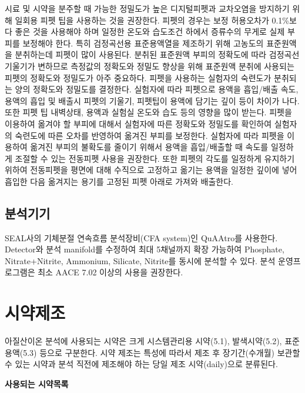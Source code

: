 \documentclass[
]{book}
\begin{document}
시료 및 시약을 분주할 때 가능한 정밀도가 높은 디지털피펫과 교차오염을 방지하기 위해 일회용 피펫 팁을 사용하는 것을 권장한다. 피펫의 경우는 보정 허용오차가 0.1\%보다 좋은 것을 사용해야 하며 일정한 온도와 습도조건 하에서 증류수의 무게로 실제 부피를 보정해야 한다. 특히 검정곡선용 표준용액열을 제조하기 위해 고농도의 표준원액을 분취하는데 피펫이 많이 사용된다. 분취된 표준원액 부피의 정확도에 따라 검정곡선 기울기가 변하므로 측정값의 정확도와 정밀도 향상을 위해 표준원액 분취에 사용되는 피펫의 정확도와 정밀도가 아주 중요하다.
피펫을 사용하는 실험자의 숙련도가 분취되는 양의 정확도와 정밀도를 결정한다. 실험자에 따라 피펫으로 용액을 흡입/배출 속도, 용액의 흡입 및 배출시 피펫의 기울기, 피펫팁이 용액에 담기는 깊이 등이 차이가 나다. 또한 피펫 팁 내벽상태, 용액과 실험실 온도와 습도 등의 영향을 많이 받는다. 피펫을 이용하여 옮겨야 할 부피에 대해서 실험자에 따른 정확도와 정밀도를 확인하여 실험자의 숙련도에 따른 오차를 반영하여 옮겨진 부피를 보정한다. 실험자에 따라 피펫을 이용하여 옮겨진 부피의 불확도를 줄이기 위해서 용액을 흡입/배출할 때 속도를 일정하게 조절할 수 있는 전동피펫 사용을 권장한다. 또한 피펫의 각도를 일정하게 유지하기 위하여 전동피펫을 평면에 대해 수직으로 고정하고 옮기는 용액을 일정한 깊이에 넣어 흡입한 다음 옮겨지는 용기를 고정된 피펫 아래로 가져와 배출한다.

\hypertarget{uxbd84uxc11duxae30uxae30}{%
\subsection{분석기기}\label{uxbd84uxc11duxae30uxae30}}

SEAL사의 기체분절 연속흐름 분석장비(CFA system)인 QuAAtro를 사용한다. Detector와 분석 manifold를 수정하여 최대 5채널까지 확장 가능하여 Phosphate, Nitrate+Nitrite, Ammonium, Silicate, Nitrite를 동시에 분석할 수 있다. 분석 운영프로그램은 최소 AACE 7.02 이상의 사용을 권장한다.

\hypertarget{uxc2dcuxc57duxc81cuxc870}{%
\section{시약제조}\label{uxc2dcuxc57duxc81cuxc870}}

아질산이온 분석에 사용되는 시약은 크게 시스템관리용 시약(5.1), 발색시약(5.2), 표준용액(5.3) 등으로 구분한다. 시약 제조는 특성에 따라서 제조 후 장기간(수개월) 보관할 수 있는 시약과 분석 직전에 제조해야 하는 당일 제조 시약(daily)으로 분류된다.

\textbf{사용되는 시약목록}
\end{document}
